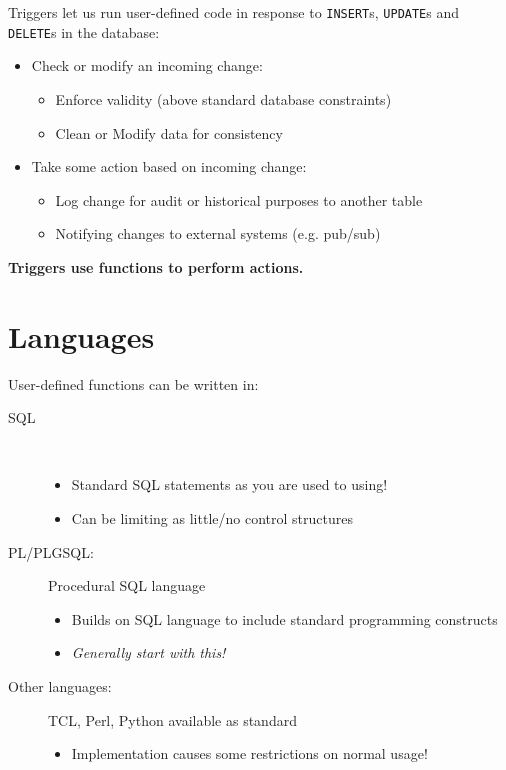 \documentclass[slides]{pgnotes}
\begin{document}
Triggers let us run user-defined code in response to \texttt{INSERT}s, \texttt{UPDATE}s and \texttt{DELETE}s in the database:
\begin{itemize}
\item Check or modify an incoming change:
  \begin{itemize}
  \item Enforce validity (above standard database constraints)
  \item Clean or Modify data for consistency
  \end{itemize}
\item Take some action based on incoming change:
  \begin{itemize}
  \item Log change for audit or historical purposes to another table
  \item Notifying changes to external systems (e.g. pub/sub)
  \end{itemize}
\end{itemize}
\textbf{Triggers use functions to perform actions.}

\section{Languages}

User-defined functions can be written in:
\begin{description}
\item[SQL] ~ 
  \begin{itemize}
  \item Standard SQL statements as you are used to using!
  \item Can be limiting as little/no control structures
  \end{itemize}
\item[PL/PLGSQL:] Procedural SQL language
  \begin{itemize}
  \item Builds on SQL language to include standard programming constructs
  \item \textit{Generally start with this!}
  \end{itemize}
\item[Other languages:] TCL, Perl, Python available as standard
  \begin{itemize}
  \item Implementation causes some restrictions on normal usage!
  \end{itemize}
\end{description}
\end{document}
